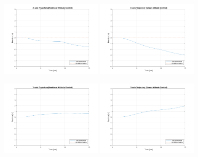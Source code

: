 \begin{figure}
    \centering
    \includegraphics[width=0.45\textwidth]{graphics/experiment_plots/yaw_plus_non_position_x.png}
    \includegraphics[width=0.45\textwidth]{graphics/experiment_plots/yaw_plus_pid_position_x.png}
    
    \includegraphics[width=0.45\textwidth]{graphics/experiment_plots/yaw_plus_non_position_y.png}
    \includegraphics[width=0.45\textwidth]{graphics/experiment_plots/yaw_plus_pid_position_y.png}
    

\end{figure}
